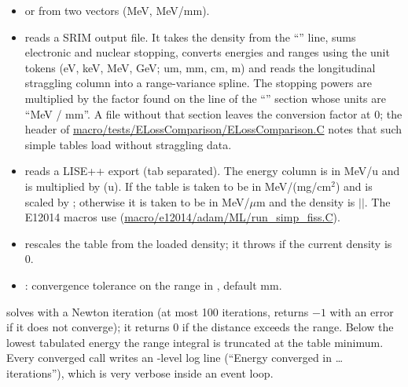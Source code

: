 \begin{itemize}
\item {} or  from two vectors
  (MeV, MeV/mm).
\item {} reads a SRIM output file. It takes the density from the
  ``'' line, sums electronic and nuclear stopping, converts energies and ranges using the unit
  tokens (eV, keV, MeV, GeV; um, mm, cm, m) and reads the longitudinal straggling column into a range-variance spline.
  The stopping powers are multiplied by the factor found on the line of the ``'' section whose units
  are ``MeV / mm''. A file without that section leaves the conversion factor at 0; the header of
  \url{macro/tests/ELossComparison/ELossComparison.C} notes that such simple tables load without straggling data.
\item {} reads a LISE++ export (tab separated). The energy
  column is in MeV/u and is multiplied by  (u). If  the table is taken to be in
  MeV/(mg/cm$^2$) and is scaled by ; otherwise it is taken to be in MeV/$\mu$m and the density is
  $|$$|$. The E12014 macros use 
  (\url{macro/e12014/adam/ML/run_simp_fiss.C}).
\item {} rescales the table from the loaded density; it throws if the current density is 0.
\item {}: convergence tolerance on the range in , default
   mm.
\end{itemize}
 solves  with a Newton iteration (at most 100 iterations, returns $-1$
with an error if it does not converge); it returns 0 if the distance exceeds the range. Below the lowest tabulated
energy the range integral is truncated at the table minimum. Every converged call writes an -level log line
(``Energy converged in \ldots{} iterations''), which is very verbose inside an event loop.

\subsection{}


